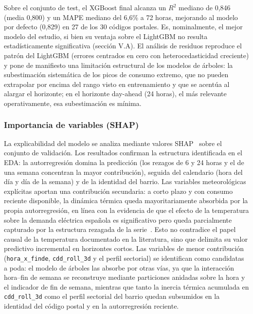 \documentclass[12pt, a4paper]{article}
\begin{document}
Sobre el conjunto de test, el XGBoost final alcanza un $R^2$ mediano de 0,846 (media 0,800) y un MAPE mediano del 6,6\% a 72 horas, mejorando al modelo por defecto (0,829) en 27 de los 30 códigos postales. Es, nominalmente, el mejor modelo del estudio, si bien su ventaja sobre el LightGBM no resulta estadísticamente significativa (sección V.A). El análisis de residuos reproduce el patrón del LightGBM (errores centrados en cero con heterocedasticidad creciente) y pone de manifiesto una limitación estructural de los modelos de árboles: la subestimación sistemática de los picos de consumo extremo, que no pueden extrapolar por encima del rango visto en entrenamiento y que se acentúa al alargar el horizonte; en el horizonte day-ahead (24 horas), el más relevante operativamente, esa subestimación es mínima.

\subsubsection{Importancia de variables (SHAP)}


La explicabilidad del modelo se analiza mediante valores SHAP~\cite{lundberg2017} sobre el conjunto de validación. Los resultados confirman la estructura identificada en el EDA: la autorregresión domina la predicción (los rezagos de 6 y 24 horas y el de una semana concentran la mayor contribución), seguida del calendario (hora del día y día de la semana) y de la identidad del barrio. Las variables meteorológicas explícitas aportan una contribución secundaria: a corto plazo y con consumo reciente disponible, la dinámica térmica queda mayoritariamente absorbida por la propia autorregresión, en línea con la evidencia de que el efecto de la temperatura sobre la demanda eléctrica española es significativo pero queda parcialmente capturado por la estructura rezagada de la serie~\cite{pardo2002}. Esto no contradice el papel causal de la temperatura documentado en la literatura, sino que delimita su valor predictivo incremental en horizontes cortos. Las variables de menor contribución (\texttt{hora\_x\_finde}, \texttt{cdd\_roll\_3d} y el perfil sectorial) se identifican como candidatas a poda: el modelo de árboles las absorbe por otras vías, ya que la interacción hora--fin de semana se reconstruye mediante particiones anidadas sobre la hora y el indicador de fin de semana, mientras que tanto la inercia térmica acumulada en \texttt{cdd\_roll\_3d} como el perfil sectorial del barrio quedan subsumidos en la identidad del código postal y en la autorregresión reciente.
\end{document}
